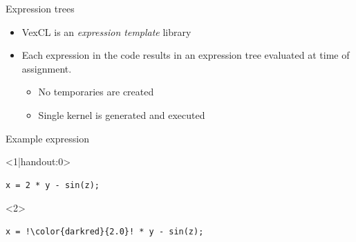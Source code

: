 \documentclass[@BEAMER_OPTIONS@]{beamer}
\newcommand{\code}[1]{\lstinline|#1|}
\begin{document}
\begin{frame}[fragile]{Expression trees}
    \begin{itemize}
        \item VexCL is an \emph{expression template} library
        \item Each expression in the code results in an expression tree
            evaluated at time of assignment.
            \begin{itemize}
                \item No temporaries are created
                \item Single kernel is generated and executed
            \end{itemize}
    \end{itemize}
    \begin{exampleblock}{Example expression}
        \begin{onlyenv}<1|handout:0>
            \begin{lstlisting}
x = 2 * y - sin(z);
            \end{lstlisting}
        \end{onlyenv}
        \begin{onlyenv}<2>
            \begin{lstlisting}[escapechar=!]
x = !\color{darkred}{2.0}! * y - sin(z);
            \end{lstlisting}
        \end{onlyenv}
    \end{exampleblock}
    \begin{figure}
    \end{figure}
\end{frame}
\end{document}
